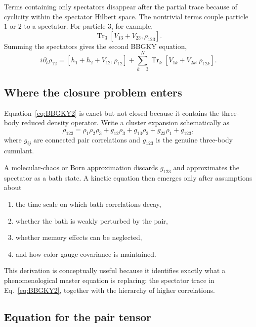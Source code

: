 \documentclass[11pt]{article}
\newcommand{\Trc}{\operatorname{Tr}}
\begin{document}
Terms containing only spectators disappear after the partial trace because of cyclicity within the spectator Hilbert space. The nontrivial terms couple particle $1$ or $2$ to a spectator. For particle $3$, for example,
\begin{equation}
\Trc_3[V_{13}+V_{23},\rho_{123}].
\end{equation}
Summing the spectators gives the second BBGKY equation,
\begin{equation}
\boxed{
i\partial_t\rho_{12}
=[h_1+h_2+V_{12},\rho_{12}]
+\sum_{k=3}^{N}\Trc_k[V_{1k}+V_{2k},\rho_{12k}].
}
\label{eq:BBGKY2}
\end{equation}

\subsection{Where the closure problem enters}

Equation~\eqref{eq:BBGKY2} is exact but not closed because it contains the three-body reduced density operator. Write a cluster expansion schematically as
\begin{equation}
\rho_{123}
=\rho_1\rho_2\rho_3
+g_{12}\rho_3+g_{13}\rho_2+g_{23}\rho_1
+g_{123},
\end{equation}
where $g_{ij}$ are connected pair correlations and $g_{123}$ is the genuine three-body cumulant.

A molecular-chaos or Born approximation discards $g_{123}$ and approximates the spectator as a bath state. A kinetic equation then emerges only after assumptions about

\begin{enumerate}[leftmargin=1.6em]
\item the time scale on which bath correlations decay,
\item whether the bath is weakly perturbed by the pair,
\item whether memory effects can be neglected,
\item and how color gauge covariance is maintained.
\end{enumerate}

This derivation is conceptually useful because it identifies exactly what a phenomenological master equation is replacing: the spectator trace in Eq.~\eqref{eq:BBGKY2}, together with the hierarchy of higher correlations.

\subsection{Equation for the pair tensor}
\end{document}

